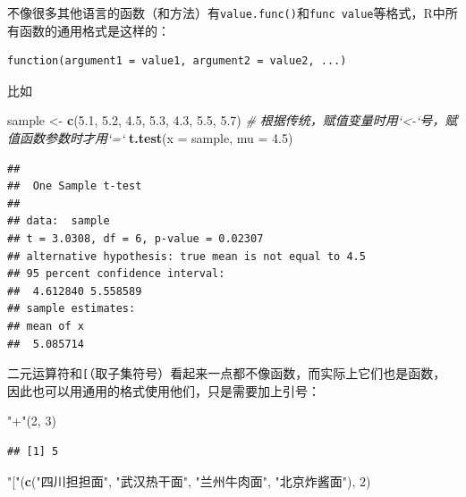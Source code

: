 \documentclass[]{book}
\newenvironment{Shaded}{\begin{snugshade}}{\end{snugshade}}
\newcommand{\CommentTok}[1]{\textcolor[rgb]{0.56,0.35,0.01}{\textit{#1}}}
\newcommand{\DataTypeTok}[1]{\textcolor[rgb]{0.13,0.29,0.53}{#1}}
\newcommand{\DecValTok}[1]{\textcolor[rgb]{0.00,0.00,0.81}{#1}}
\newcommand{\FloatTok}[1]{\textcolor[rgb]{0.00,0.00,0.81}{#1}}
\newcommand{\KeywordTok}[1]{\textcolor[rgb]{0.13,0.29,0.53}{\textbf{#1}}}
\newcommand{\NormalTok}[1]{#1}
\newcommand{\StringTok}[1]{\textcolor[rgb]{0.31,0.60,0.02}{#1}}
\begin{document}
不像很多其他语言的函数（和方法）有\texttt{value.func()}和\texttt{func\ value}等格式，R中所有函数的通用格式是这样的：

\begin{verbatim}
function(argument1 = value1, argument2 = value2, ...)
\end{verbatim}

比如

\begin{Shaded}
\begin{Highlighting}[]
\NormalTok{sample <-}\StringTok{ }\KeywordTok{c}\NormalTok{(}\FloatTok{5.1}\NormalTok{, }\FloatTok{5.2}\NormalTok{, }\FloatTok{4.5}\NormalTok{, }\FloatTok{5.3}\NormalTok{, }\FloatTok{4.3}\NormalTok{, }\FloatTok{5.5}\NormalTok{, }\FloatTok{5.7}\NormalTok{)}
\CommentTok{# 根据传统，赋值变量时用`<-`号，赋值函数参数时才用`=`}
\KeywordTok{t.test}\NormalTok{(}\DataTypeTok{x =}\NormalTok{ sample, }\DataTypeTok{mu =} \FloatTok{4.5}\NormalTok{)}
\end{Highlighting}
\end{Shaded}

\begin{verbatim}
## 
##  One Sample t-test
## 
## data:  sample
## t = 3.0308, df = 6, p-value = 0.02307
## alternative hypothesis: true mean is not equal to 4.5
## 95 percent confidence interval:
##  4.612840 5.558589
## sample estimates:
## mean of x 
##  5.085714
\end{verbatim}

二元运算符和\texttt{{[}}（取子集符号）看起来一点都不像函数，而实际上它们也是函数，因此也可以用通用的格式使用他们，只是需要加上引号：

\begin{Shaded}
\begin{Highlighting}[]
\StringTok{"+"}\NormalTok{(}\DecValTok{2}\NormalTok{, }\DecValTok{3}\NormalTok{)}
\end{Highlighting}
\end{Shaded}

\begin{verbatim}
## [1] 5
\end{verbatim}

\begin{Shaded}
\begin{Highlighting}[]
\StringTok{"["}\NormalTok{(}\KeywordTok{c}\NormalTok{(}\StringTok{"四川担担面"}\NormalTok{, }\StringTok{"武汉热干面"}\NormalTok{, }\StringTok{"兰州牛肉面"}\NormalTok{, }\StringTok{"北京炸酱面"}\NormalTok{), }\DecValTok{2}\NormalTok{)}
\end{Highlighting}
\end{Shaded}
\end{document}

